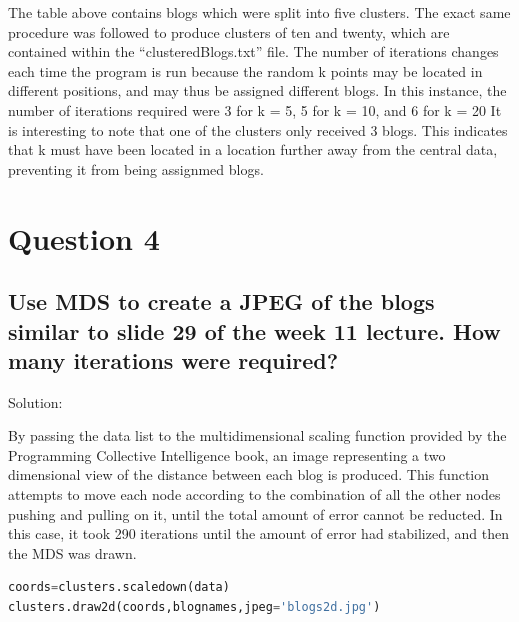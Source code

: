 \documentclass[11pt]{scrartcl} %
\begin{document}
\tabto{2.0cm} The table above contains blogs which were split into five clusters. The exact same procedure was followed to produce clusters of ten and twenty, which are contained within the ``clusteredBlogs.txt'' file. \newline \newline The number of iterations changes each time the program is run because the random k points may be located in different positions, and may thus be assigned different blogs. In this instance, the number of iterations required were 3 for k = 5, 5 for k = 10, and 6 for k = 20 \newline \newline
\tabto{2.0cm} It is interesting to note that one of the clusters only received 3 blogs. This indicates that k must have been located in a location further away from the central data, preventing it from being assignmed blogs.
\pagebreak

\section*{Question 4}


\subsection*{Use MDS to create a JPEG of the blogs similar to slide 29 of the 
week 11 lecture.  How many iterations were required?}

\bigskip\bigskip
\LARGE Solution: \newline\newline\small

\tabto{2.0 cm} By passing the data list to the multidimensional scaling function provided by the Programming Collective Intelligence book, an image representing a two dimensional view of the distance between each blog is produced. This function attempts to move each node according to the combination of all the other nodes pushing and pulling on it, until the total amount of error cannot be reducted. In this case, it took 290 iterations until the amount of error had stabilized, and then the MDS was drawn.


 \begin{lstlisting}[language = Python, caption=Drawing 2d from Programming Collective Intelligence]
coords=clusters.scaledown(data)
clusters.draw2d(coords,blognames,jpeg='blogs2d.jpg')

\end{lstlisting}
\end{document}

